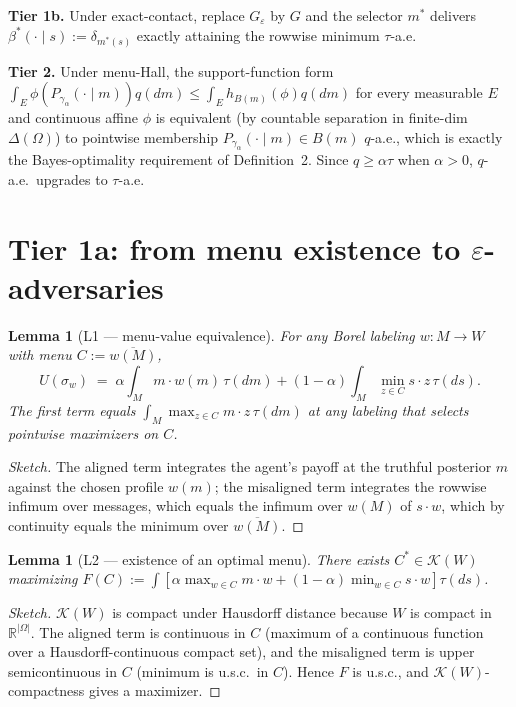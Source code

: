 \documentclass[11pt]{article}
\newtheorem{lemma}[theorem]{Lemma}
\theoremstyle{definition}
\theoremstyle{remark}
\newcommand{\R}{\mathbb{R}}
\newcommand{\eps}{\varepsilon}
\newcommand{\Om}{\Omega}
\begin{document}
\textbf{Tier 1b.} Under exact-contact, replace $G_\eps$ by $G$
and the selector $m^*$ delivers $\beta^*(\cdot\mid s) := \delta_{m^*(s)}$
exactly attaining the rowwise minimum $\tau$-a.e.

\textbf{Tier 2.} Under menu-Hall, the support-function form
$\int_E\phi(P_{\gamma_\alpha}(\cdot\mid m))q(dm) \le \int_E h_{B(m)}(\phi)q(dm)$
for every measurable $E$ and continuous affine $\phi$ is equivalent
(by countable separation in finite-dim $\Delta(\Om)$) to pointwise
membership $P_{\gamma_\alpha}(\cdot\mid m)\in B(m)$ $q$-a.e., which
is exactly the Bayes-optimality requirement of Definition~2. Since
$q\ge\alpha\tau$ when $\alpha>0$, $q$-a.e.~upgrades to $\tau$-a.e.

\section{Tier 1a: from menu existence to $\eps$-adversaries}\label{sec:tier1a}

\begin{lemma}[L1 --- menu-value equivalence]\label{lem:menu-value}
For any Borel labeling $w:M\to W$ with menu $C := \overline{w(M)}$,
\[
  U(\sigma_w) \;=\; \alpha\!\int_M m\cdot w(m)\,\tau(dm) + (1-\alpha)\!\int_M\min_{z\in C} s\cdot z\,\tau(ds).
\]
The first term equals $\int_M\max_{z\in C}m\cdot z\,\tau(dm)$ at any
labeling that selects pointwise maximizers on $C$.
\end{lemma}

\begin{proof}[Sketch]
The aligned term integrates the agent's payoff at the truthful
posterior $m$ against the chosen profile $w(m)$; the misaligned
term integrates the rowwise infimum over messages, which equals the
infimum over $w(M)$ of $s\cdot w$, which by continuity equals the
minimum over $\overline{w(M)}$.
\end{proof}

\begin{lemma}[L2 --- existence of an optimal menu]\label{lem:menu-exist}
There exists $C^*\in\mathcal K(W)$ maximizing
$F(C) := \int[\alpha\max_{w\in C}m\cdot w + (1-\alpha)\min_{w\in C}s\cdot w]\tau(ds)$.
\end{lemma}

\begin{proof}[Sketch]
$\mathcal K(W)$ is compact under Hausdorff distance because $W$ is
compact in $\R^{|\Om|}$. The aligned term is continuous in $C$
(maximum of a continuous function over a Hausdorff-continuous compact
set), and the misaligned term is upper semicontinuous in $C$
(minimum is u.s.c.\ in $C$). Hence $F$ is u.s.c., and
$\mathcal K(W)$-compactness gives a maximizer.
\end{proof}
\end{document}
